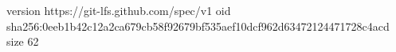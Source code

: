 version https://git-lfs.github.com/spec/v1
oid sha256:0eeb1b42c12a2ca679cb58f92679bf535aef10dcf962d63472124471728c4acd
size 62
